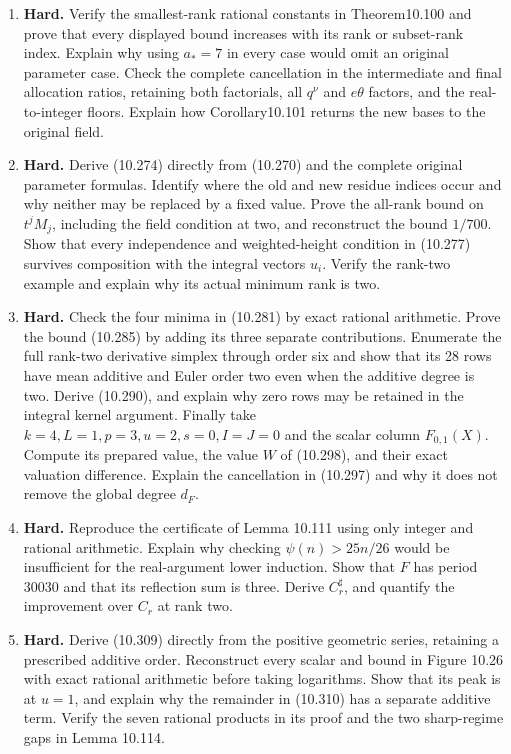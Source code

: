 \documentclass[
  11pt,
  a4paper,
]{article}
\begin{document}
\begin{enumerate}
  the old argument. Explain the relevant integrality at three and two.
  Reconstruct all seventeen rows of the table in Theorem 10.98,
  retaining the odd-node loss, the true contracted Euler bound and both
  global field factors. Give the stage-one and stage-seventeen radii,
  orders and mixed multiplicities. Complete the polynomial
  contradiction.
\item
  \textbf{Hard.} Verify the smallest-rank rational constants in
  Theorem10.100 and prove that every displayed bound increases with its
  rank or subset-rank index. Explain why using \(a_*=7\) in every case
  would omit an original parameter case. Check the complete cancellation
  in the intermediate and final allocation ratios, retaining both
  factorials, all \(q^\nu\) and \(e\theta\) factors, and the
  real-to-integer floors. Explain how Corollary10.101 returns the new
  bases to the original field.
\item
  \textbf{Hard.} Derive (10.274) directly from (10.270) and the complete
  original parameter formulas. Identify where the old and new residue
  indices occur and why neither may be replaced by a fixed value. Prove
  the all-rank bound on \(t^jM_j\), including the field condition at
  two, and reconstruct the bound \(1/700\). Show that every independence
  and weighted-height condition in (10.277) survives composition with
  the integral vectors \(u_i\). Verify the rank-two example and explain
  why its actual minimum rank is two.
\item
  \textbf{Hard.} Check the four minima in (10.281) by exact rational
  arithmetic. Prove the bound (10.285) by adding its three separate
  contributions. Enumerate the full rank-two derivative simplex through
  order six and show that its 28 rows have mean additive and Euler order
  two even when the additive degree is two. Derive (10.290), and explain
  why zero rows may be retained in the integral kernel argument. Finally
  take \(k=4,L=1,p=3,u=2,s=0,I=J=0\) and the scalar column
  \(F_{0,1}(X)\). Compute its prepared value, the value \(W\) of
  (10.298), and their exact valuation difference. Explain the
  cancellation in (10.297) and why it does not remove the global degree
  \(d_F\).
\item
  \textbf{Hard.} Reproduce the certificate of Lemma 10.111 using only
  integer and rational arithmetic. Explain why checking
  \(\psi(n)>25n/26\) would be insufficient for the real-argument lower
  induction. Show that \(F\) has period 30030 and that its reflection
  sum is three. Derive \(C_r^{\sharp}\), and quantify the improvement
  over \(C_r\) at rank two.
\item
  \textbf{Hard.} Derive (10.309) directly from the positive geometric
  series, retaining a prescribed additive order. Reconstruct every
  scalar and bound in Figure 10.26 with exact rational arithmetic before
  taking logarithms. Show that its peak is at \(u=1\), and explain why
  the remainder in (10.310) has a separate additive term. Verify the
  seven rational products in its proof and the two sharp-regime gaps in
  Lemma 10.114.
\end{enumerate}
\end{document}
